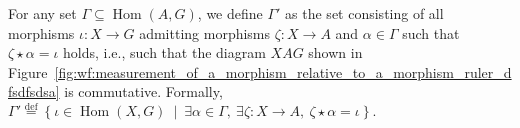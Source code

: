 For any set \( \Gamma \subseteq \operatorname{Hom}(A, G) \),
    we define $\Gamma'$ as the set consisting of all morphisms \( \iota : X \to G \) admitting morphisms \( \zeta \colon X \to A \) and \( \alpha \in \Gamma \) such that $\zeta \star \alpha = \iota$ holds, i.e., such that
     the diagram $XAG$ shown in Figure~\ref{fig:wf:measurement_of_a_morphism_relative_to_a_morphism_ruler_dfsdfsdsa} is commutative.  Formally,  
    \(
    \Gamma' \overset{\operatorname{def}}{=} \left\{ \iota \in \operatorname{Hom}(X, G)~\middle|~\exists \alpha \in \Gamma,~\exists \zeta:X \to A,~\zeta \star \alpha = \iota \right\}. 
    \)
    \begin{center}
    \end{center}
    


